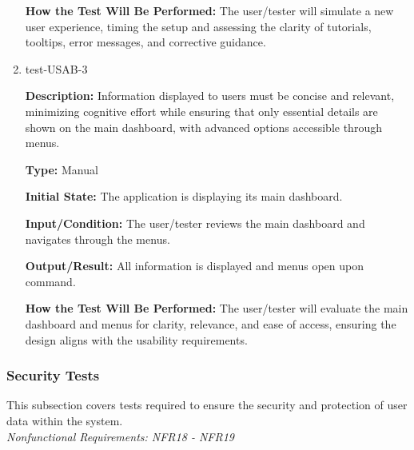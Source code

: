 \documentclass[12pt, titlepage]{article}
\begin{document}
\begin{enumerate}
\textbf{How the Test Will Be Performed:} The user/tester will simulate a new user experience, timing the setup and assessing the clarity of tutorials, tooltips, error messages, and corrective guidance.

\item{test-USAB-3\\}

\textbf{Description:} Information displayed to users must be concise and relevant, minimizing cognitive effort while ensuring that only essential details are shown on the main dashboard, with advanced options accessible through menus.

\textbf{Type:} Manual
					
\textbf{Initial State:} The application is displaying its main dashboard.
					
\textbf{Input/Condition:} The user/tester reviews the main dashboard and navigates through the menus.
					
\textbf{Output/Result:} All information is displayed and menus open upon command.
					
\textbf{How the Test Will Be Performed:} The user/tester will evaluate the main dashboard and menus for clarity, relevance, and ease of access, ensuring the design aligns with the usability requirements.

\end{enumerate}

\subsubsection{Security Tests}

This subsection covers tests required to ensure the security and protection of user data within the system. \\
\textit{Nonfunctional Requirements: NFR18 - NFR19}
\end{document}
